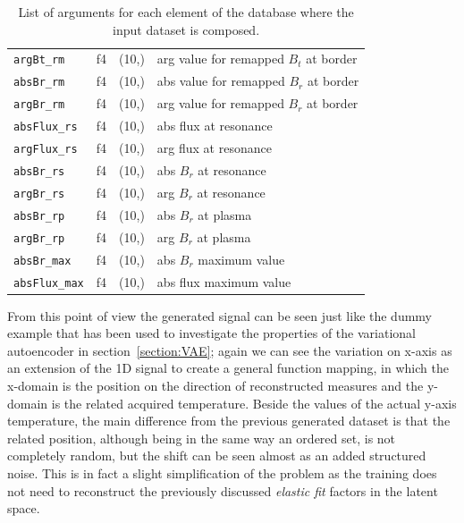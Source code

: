 \begin{table}[]
\begin{tabular}{l|l|l|l}
\verb|argBt_rm   | & f4         & (10,)     &   arg value for remapped $B_t$ at border              \\
\verb|absBr_rm   | & f4         & (10,)     &   abs value for remapped $B_r$ at border              \\
\verb|argBr_rm   | & f4         & (10,)     &   arg value for remapped $B_r$ at border              \\
\verb|absFlux_rs | & f4         & (10,)     &   abs flux at resonance                               \\
\verb|argFlux_rs | & f4         & (10,)     &   arg flux at resonance                               \\
\verb|absBr_rs   | & f4         & (10,)     &   abs $B_r$ at resonance                              \\
\verb|argBr_rs   | & f4         & (10,)     &   arg $B_r$ at resonance                              \\
\verb|absBr_rp   | & f4         & (10,)     &   abs $B_r$ at plasma                                 \\
\verb|argBr_rp   | & f4         & (10,)     &   arg $B_r$ at plasma                                 \\
\verb|absBr_max  | & f4         & (10,)     &   abs $B_r$ maximum value                             \\
\verb|absFlux_max| & f4         & (10,)     &   abs flux maximum value
    \end{tabular}
    \caption{List of arguments for each element of the database where the input dataset is composed. }
    \label{tab:database}
\end{table}
From this point of view the generated signal can be seen just like the dummy example that has been used to investigate the properties of the variational autoencoder in section~\cref{section:VAE}; again we can see the variation on x-axis as an extension of the 1D signal to create a general function mapping, in which the x-domain is the position on the direction of reconstructed measures and the y-domain is the related acquired temperature.
Beside the values of the actual y-axis temperature, the main difference from the previous generated dataset is that the related position, although being in the same way an ordered set, is not completely random, but the shift can be seen almost as an added structured noise.
This is in fact a slight simplification of the problem as the training does not need to reconstruct the previously discussed \textit{elastic fit} factors in the latent space.

